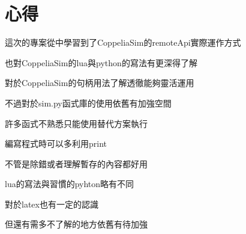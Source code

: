 \chapter{心得}
這次的專案從中學習到了CoppeliaSim的remoteApi實際運作方式

也對CoppeliaSim的lua與python的寫法有更深得了解

對於CoppeliaSim的句柄用法了解透徹能夠靈活運用

不過對於sim.py函式庫的使用依舊有加強空間

許多函式不熟悉只能使用替代方案執行

編寫程式時可以多利用print

不管是除錯或者理解暫存的內容都好用

lua的寫法與習慣的pyhton略有不同

對於latex也有一定的認識

但還有需多不了解的地方依舊有待加強
\newpage